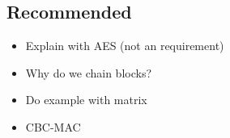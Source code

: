 
\subsection{Recommended}
\begin{itemize}
\item Explain with AES (not an requirement)
\item Why do we chain blocks?
\item Do example with matrix
\item CBC-MAC
\end{itemize}
